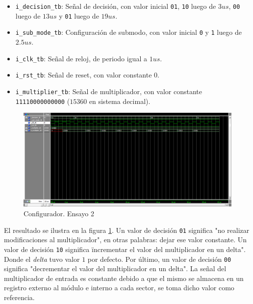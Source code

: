 \begin{itemize}

\item
\texttt{i\_decision\_tb}: Señal de decisión, con valor inicial \texttt{01}, \texttt{10} luego de $3 us$, \texttt{00} luego de $13 us$ y \texttt{01} luego de $19 us$.

\item
\texttt{i\_sub\_mode\_tb}: Configuración de submodo, con valor inicial \texttt{0} y \texttt{1} luego de $2.5 us$.

\item
\texttt{i\_clk\_tb}: Señal de reloj, de periodo igual a $1 us$.

\item
\texttt{i\_rst\_tb}: Señal de reset, con valor constante $0$.

\item
\texttt{i\_multiplier\_tb}: Señal de multiplicador, con valor constante \texttt{11110000000000} ($15360$ en sistema decimal).

\end{itemize}

\begin{figure}
\centering
\includegraphics[scale=0.52, angle=270]{./Figures/multiplier_setting_ensayo_1.png}
\caption{Configurador. Ensayo 2}
\label{fig:multiplier_setting_ensayo_1}
\end{figure}

El resultado se ilustra en la figura \ref{fig:multiplier_setting_ensayo_1}. Un valor de decisión \texttt{01} significa "no realizar modificaciones al multiplicador", en otras palabras: dejar ese valor constante. Un valor de decisión \texttt{10} significa \"incrementar el valor del multiplicador en un delta". Donde el \textit{delta} tuvo valor $1$ por defecto. Por último, un valor de decisión \texttt{00} significa "decrementar el valor del multiplicador en un delta". La señal del multiplicador de entrada es constante debido a que el mismo se almacena en un registro externo al módulo e interno a cada sector, se toma dicho valor como referencia.

